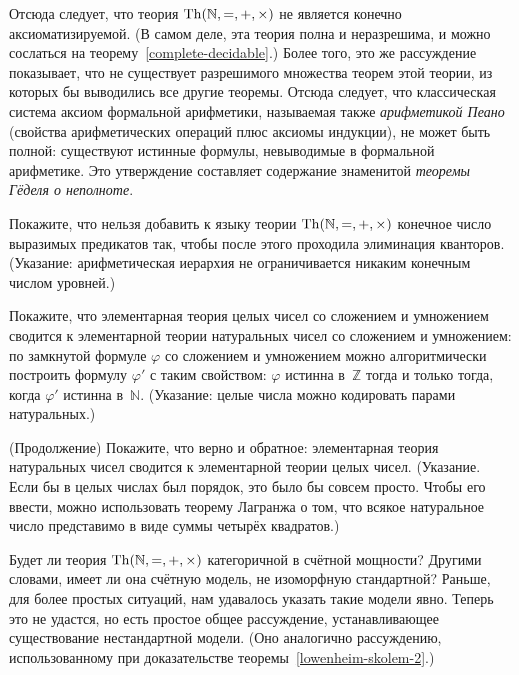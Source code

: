 Отсюда следует, что теория $\operatorname{Th}(\mathbb{N},{=},{+},{\times})$ не
является конечно аксиоматизируемой. (В самом деле, эта теория
полна и неразрешима, и можно сослаться на
теорему~\ref{complete-decidable}.) Более того, это же
рассуждение показывает, что не существует разрешимого
множества теорем этой теории, из которых бы выводились все
другие теоремы. Отсюда следует, что классическая система аксиом
формальной арифметики, называемая также \emph{арифметикой Пеано}%
%
%
(свойства арифметических операций плюс аксиомы индукции), не
может быть полной: существуют истинные формулы, невыводимые в
формальной арифметике. Это утверждение составляет содержание
знаменитой \emph{теоремы Гёделя о неполноте}.%
%

\begin{problem}
Покажите, что нельзя добавить к языку теории
$\operatorname{Th}(\mathbb{N},{=},{+},{\times})$ конечное число выразимых
предикатов так, чтобы после этого проходила элиминация
кванторов.%
(Указание: арифметическая иерархия не ограничивается
никаким конечным числом уровней.)
\end{problem}

\begin{problem}
Покажите, что элементарная теория целых чисел со сложением и
умножением сводится к элементарной теории натуральных чисел со
сложением и умножением: по замкнутой формуле $\varphi$ со сложением
и умножением можно алгоритмически построить формулу $\varphi'$
с таким свойством: $\varphi$ истинна в~$\mathbb{Z}$ тогда и только
тогда, когда $\varphi'$ истинна в~$\mathbb{N}$. (Указание: целые
числа можно кодировать парами натуральных.)
\end{problem}

\begin{problem}
(Продолжение) Покажите, что верно и обратное: элементарная
теория натуральных чисел сводится к элементарной теории целых
чисел. (Указание. Если бы в целых числах был порядок, это было
бы совсем просто. Чтобы его ввести, можно использовать теорему
Лагранжа о том, что всякое натуральное число представимо в виде
суммы четырёх квадратов.)
\end{problem}

Будет ли теория $\operatorname{Th}(\mathbb{N},{=},{+},{\times})$ категоричной
в счётной мощности? Другими словами, имеет ли она
счётную модель, не изоморфную стандартной? Раньше,
для более простых ситуаций, нам удавалось указать такие модели
явно. Теперь это не удастся, но есть простое общее рассуждение,
устанавливающее существование нестандартной модели. (Оно
аналогично рассуждению, использованному при доказательстве
теоремы~\ref{lowenheim-skolem-2}.)

